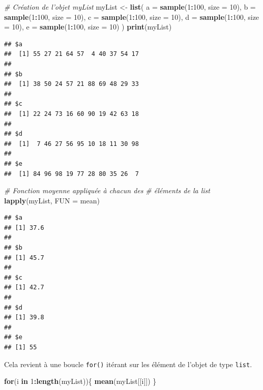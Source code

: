 \documentclass[
]{book}
\newenvironment{Shaded}{\begin{snugshade}}{\end{snugshade}}
\newcommand{\CommentTok}[1]{\textcolor[rgb]{0.56,0.35,0.01}{\textit{#1}}}
\newcommand{\ControlFlowTok}[1]{\textcolor[rgb]{0.13,0.29,0.53}{\textbf{#1}}}
\newcommand{\DataTypeTok}[1]{\textcolor[rgb]{0.13,0.29,0.53}{#1}}
\newcommand{\DecValTok}[1]{\textcolor[rgb]{0.00,0.00,0.81}{#1}}
\newcommand{\KeywordTok}[1]{\textcolor[rgb]{0.13,0.29,0.53}{\textbf{#1}}}
\newcommand{\NormalTok}[1]{#1}
\newcommand{\OperatorTok}[1]{\textcolor[rgb]{0.81,0.36,0.00}{\textbf{#1}}}
\newcommand{\StringTok}[1]{\textcolor[rgb]{0.31,0.60,0.02}{#1}}
\begin{document}
\begin{Shaded}
\begin{Highlighting}[]
\CommentTok{# Création de l'objet myList}
\NormalTok{myList <-}\StringTok{ }\KeywordTok{list}\NormalTok{(}
  \DataTypeTok{a =} \KeywordTok{sample}\NormalTok{(}\DecValTok{1}\OperatorTok{:}\DecValTok{100}\NormalTok{, }\DataTypeTok{size =} \DecValTok{10}\NormalTok{), }
  \DataTypeTok{b =} \KeywordTok{sample}\NormalTok{(}\DecValTok{1}\OperatorTok{:}\DecValTok{100}\NormalTok{, }\DataTypeTok{size =} \DecValTok{10}\NormalTok{), }
  \DataTypeTok{c =} \KeywordTok{sample}\NormalTok{(}\DecValTok{1}\OperatorTok{:}\DecValTok{100}\NormalTok{, }\DataTypeTok{size =} \DecValTok{10}\NormalTok{), }
  \DataTypeTok{d =} \KeywordTok{sample}\NormalTok{(}\DecValTok{1}\OperatorTok{:}\DecValTok{100}\NormalTok{, }\DataTypeTok{size =} \DecValTok{10}\NormalTok{), }
  \DataTypeTok{e =} \KeywordTok{sample}\NormalTok{(}\DecValTok{1}\OperatorTok{:}\DecValTok{100}\NormalTok{, }\DataTypeTok{size =} \DecValTok{10}\NormalTok{)}
\NormalTok{)}
\KeywordTok{print}\NormalTok{(myList)}
\end{Highlighting}
\end{Shaded}

\begin{verbatim}
## $a
##  [1] 55 27 21 64 57  4 40 37 54 17
## 
## $b
##  [1] 38 50 24 57 21 88 69 48 29 33
## 
## $c
##  [1] 22 24 73 16 60 90 19 42 63 18
## 
## $d
##  [1]  7 46 27 56 95 10 18 11 30 98
## 
## $e
##  [1] 84 96 98 19 77 28 80 35 26  7
\end{verbatim}

\begin{Shaded}
\begin{Highlighting}[]
\CommentTok{# Fonction moyenne appliquée à chacun des}
\CommentTok{# éléments de la list}
\KeywordTok{lapply}\NormalTok{(myList, }\DataTypeTok{FUN =}\NormalTok{ mean)}
\end{Highlighting}
\end{Shaded}

\begin{verbatim}
## $a
## [1] 37.6
## 
## $b
## [1] 45.7
## 
## $c
## [1] 42.7
## 
## $d
## [1] 39.8
## 
## $e
## [1] 55
\end{verbatim}

Cela revient à une boucle \texttt{for()} itérant sur les élément de l'objet de type \texttt{list}.

\begin{Shaded}
\begin{Highlighting}[]
\ControlFlowTok{for}\NormalTok{(i }\ControlFlowTok{in} \DecValTok{1}\OperatorTok{:}\KeywordTok{length}\NormalTok{(myList))\{}
  \KeywordTok{mean}\NormalTok{(myList[[i]])}
\NormalTok{\}}
\end{Highlighting}
\end{Shaded}
\end{document}
